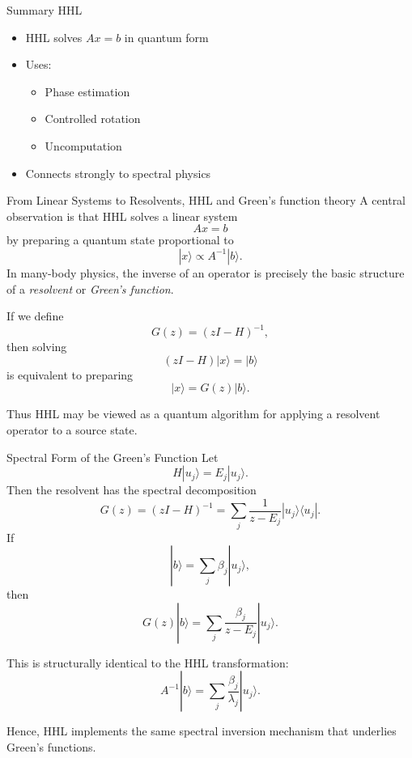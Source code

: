 \documentclass{beamer}
\begin{document}
\begin{frame}{Summary HHL}
\begin{itemize}
\item HHL solves $A x = b$ in quantum form
\item Uses:
\begin{itemize}
\item Phase estimation
\item Controlled rotation
\item Uncomputation
\end{itemize}
\item Connects strongly to spectral physics
\end{itemize}
\end{frame}



\begin{frame}{From Linear Systems to Resolvents, HHL and Green's function theory}
A central observation is that HHL solves a linear system
\[
A x = b
\]
by preparing a quantum state proportional to
\[
|x\rangle \propto A^{-1}|b\rangle.
\]
In many-body physics, the inverse of an operator is precisely the basic structure of a
\emph{resolvent} or \emph{Green's function}.

If we define
\[
G(z) = (z I - H)^{-1},
\]
then solving
\[
(zI-H)|x\rangle = |b\rangle
\]
is equivalent to preparing
\[
|x\rangle = G(z)|b\rangle.
\]

Thus HHL may be viewed as a quantum algorithm for applying a resolvent operator to a source state.
\end{frame}


\begin{frame}{Spectral Form of the Green's Function}
Let
\[
H|u_j\rangle = E_j |u_j\rangle.
\]
Then the resolvent has the spectral decomposition
\[
G(z) = (zI-H)^{-1}
= \sum_j \frac{1}{z-E_j} |u_j\rangle \langle u_j|.
\]
If
\[
|b\rangle = \sum_j \beta_j |u_j\rangle,
\]
then
\[
G(z)|b\rangle = \sum_j \frac{\beta_j}{z-E_j}|u_j\rangle.
\]

This is structurally identical to the HHL transformation:
\[
A^{-1}|b\rangle
=
\sum_j \frac{\beta_j}{\lambda_j}|u_j\rangle.
\]

Hence, HHL implements the same spectral inversion mechanism that underlies Green's functions.
\end{frame}
\end{document}
